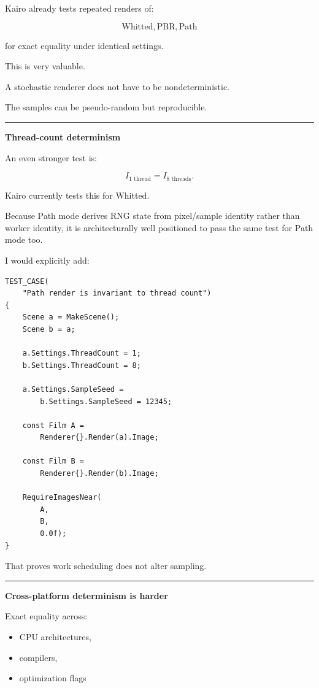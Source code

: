 Kairo already tests repeated renders of:

\[
\text{Whitted},
\text{PBR},
\text{Path}
\]

for exact equality under identical settings.

This is very valuable.

A stochastic renderer does not have to be nondeterministic.

The samples can be pseudo-random but reproducible.

\begin{center}\rule{0.5\linewidth}{0.5pt}\end{center}

\textbf{Thread-count determinism}

An even stronger test is:

\[
I_{\text{1 thread}}
=
I_{\text{8 threads}}.
\]

Kairo currently tests this for Whitted.

Because Path mode derives RNG state from pixel/sample identity rather than worker identity, it is architecturally well positioned to pass the same test for Path mode too.

I would explicitly add:

\begin{verbatim}
TEST_CASE(
    "Path render is invariant to thread count")
{
    Scene a = MakeScene();
    Scene b = a;

    a.Settings.ThreadCount = 1;
    b.Settings.ThreadCount = 8;

    a.Settings.SampleSeed =
        b.Settings.SampleSeed = 12345;

    const Film A =
        Renderer{}.Render(a).Image;

    const Film B =
        Renderer{}.Render(b).Image;

    RequireImagesNear(
        A,
        B,
        0.0f);
}
\end{verbatim}

That proves work scheduling does not alter sampling.

\begin{center}\rule{0.5\linewidth}{0.5pt}\end{center}

\textbf{Cross-platform determinism is harder}

Exact equality across:

\begin{itemize}
\tightlist
\item
  CPU architectures,
\item
  compilers,
\item
  optimization flags
\end{itemize}

